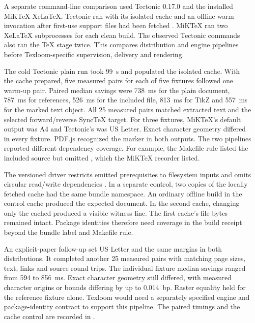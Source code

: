 A separate command-line comparison used Tectonic 0.17.0 and the installed
MiKTeX Xe\LaTeX{}. Tectonic ran with its isolated cache and an offline
warm invocation after first-use support files had been fetched
\cite{tectonic017,tectoniccompile}. MiKTeX ran two Xe\LaTeX{} subprocesses
for each clean build. The observed Tectonic commands also ran the TeX
stage twice. This compares distribution and engine pipelines before
Texloom-specific supervision, delivery and rendering.

The cold Tectonic plain run took 99~s and populated the isolated cache.
With the cache prepared, five measured pairs for each of five fixtures
followed one warm-up pair. Paired median savings were 738~ms for the plain
document, 787~ms for references, 526~ms for the included file, 813~ms for
TikZ and 557~ms for the marked text object. All 25 measured pairs matched
extracted text and the selected forward/reverse SyncTeX target. For three
fixtures, MiKTeX's default output was A4 and Tectonic's was US Letter.
Exact character geometry differed in every fixture. PDF.js recognized the
marker in both outputs. The two pipelines reported different dependency
coverage. For example, the Makefile rule listed the included source but
omitted , which the MiKTeX recorder listed.

The versioned driver restricts emitted prerequisites to filesystem inputs
and omits circular read/write dependencies \cite{tectonicdriver}. In a
separate control, two copies of the locally fetched cache had the same
bundle namespace. An ordinary offline build in the control cache produced
the expected document. In the second cache, changing only the cached
 produced a visible witness line. The first cache's
file bytes remained intact. Package identities therefore need coverage
in the build receipt beyond the bundle label and Makefile rule.


An explicit-paper follow-up set US Letter and the same margins in both
distributions. It completed another 25 measured pairs with matching page
sizes, text, links and source round trips. The individual fixture median
savings ranged from 594 to 856~ms. Exact character geometry still differed, with measured character origins or
bounds differing by up to 0.014~bp. Raster equality held for the
reference fixture alone. Texloom would need
a separately specified engine and package-identity contract to support this
pipeline. The paired timings and the cache control are recorded in
.



